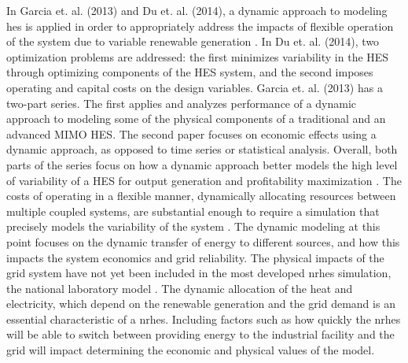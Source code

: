 In Garcia et. al. (2013) and Du et. al. (2014), a dynamic approach to modeling \ac{hes} is applied in order to appropriately address the impacts of flexible operation of the system due to variable renewable generation \cite{Garcia2013, Du2014}. In Du et. al. (2014), two optimization problems are addressed: the first minimizes variability in the HES through optimizing components of the HES system, and the second imposes operating and capital costs on the design variables. Garcia et. al. (2013) has a two-part series. The first applies and analyzes performance of a dynamic approach to modeling some of the physical components of a traditional and an advanced MIMO HES. The second paper focuses on economic effects using a dynamic approach, as opposed to time series or statistical analysis. Overall, both parts of the series focus on how a dynamic approach better models the high level of variability of a HES for output generation and profitability maximization \cite{Garcia2013}. The costs of operating in a flexible manner, dynamically allocating resources between multiple coupled systems, are substantial enough to require a simulation that precisely models the variability of the system \cite{Garcia2013, Shropshire2011, Locatelli2015}. The dynamic modeling at this point focuses on the dynamic transfer of energy to different sources, and how this impacts the system economics and grid reliability. The physical impacts of the grid system have not yet been included in the most developed \ac{nrhes} simulation, the national laboratory model \cite{Harrison2016}.  The dynamic allocation of the heat and electricity, which depend on the renewable generation and the grid demand is an essential characteristic of a \ac{nrhes}.  Including factors such as how quickly the \ac{nrhes} will be able to switch between providing energy to the industrial facility and the grid will impact determining the economic and physical values of the model.

